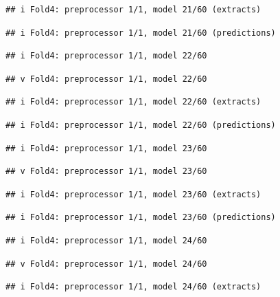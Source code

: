 \documentclass[
]{article}
\begin{document}
\begin{verbatim}
## i Fold4: preprocessor 1/1, model 21/60 (extracts)
\end{verbatim}

\begin{verbatim}
## i Fold4: preprocessor 1/1, model 21/60 (predictions)
\end{verbatim}

\begin{verbatim}
## i Fold4: preprocessor 1/1, model 22/60
\end{verbatim}

\begin{verbatim}
## v Fold4: preprocessor 1/1, model 22/60
\end{verbatim}

\begin{verbatim}
## i Fold4: preprocessor 1/1, model 22/60 (extracts)
\end{verbatim}

\begin{verbatim}
## i Fold4: preprocessor 1/1, model 22/60 (predictions)
\end{verbatim}

\begin{verbatim}
## i Fold4: preprocessor 1/1, model 23/60
\end{verbatim}

\begin{verbatim}
## v Fold4: preprocessor 1/1, model 23/60
\end{verbatim}

\begin{verbatim}
## i Fold4: preprocessor 1/1, model 23/60 (extracts)
\end{verbatim}

\begin{verbatim}
## i Fold4: preprocessor 1/1, model 23/60 (predictions)
\end{verbatim}

\begin{verbatim}
## i Fold4: preprocessor 1/1, model 24/60
\end{verbatim}

\begin{verbatim}
## v Fold4: preprocessor 1/1, model 24/60
\end{verbatim}

\begin{verbatim}
## i Fold4: preprocessor 1/1, model 24/60 (extracts)
\end{verbatim}
\end{document}
